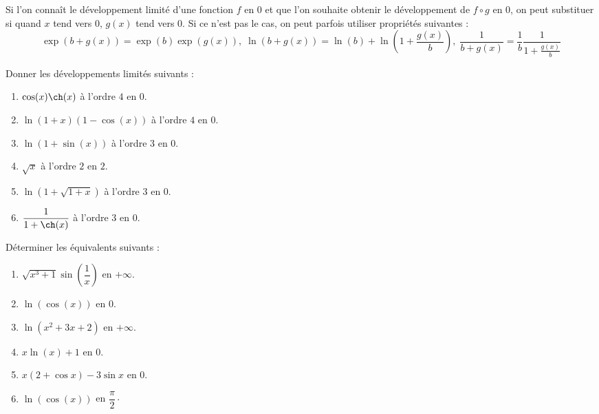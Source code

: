 \documentclass[a4paper,twoside,french,10pt]{VcCours}
\begin{document}
\medskip

Si l'on connaît le développement limité d'une fonction $f$ en $0$ et que l'on souhaite obtenir le développement de $f \circ g$ en $0$, on peut substituer si quand $x$ tend vers $0$, $g(x)$ tend vers $0$. Si ce n'est pas le cas, on peut parfois utiliser propriétés suivantes :
$$ \exp(b+g(x)) = \exp(b) \exp(g(x)), \; \ln(b+g(x))= \ln(b)+ \ln \left( 1 + \frac{g(x)}{b} \right), \; \frac{1}{b+g(x)} = \frac{1}{b}\frac{1}{1+ \frac{g(x)}{b}}$$

\medskip

\begin{Exercice}{}\end{Exercice} Donner les développements limités suivants : 

\begin{multicols}{2}
\begin{enumerate}
\item $\cos(x) \ch(x)$ à l'ordre $4$ en $0$.
\item $\ln(1+x)(1-\cos(x))$ à l'ordre $4$ en $0$.
\item $\ln(1+ \sin(x))$ à l'ordre $3$ en $0$.
\columnbreak
\item $\sqrt{x}$ à l'ordre $2$ en $2$.
\item $\ln(1 + \sqrt {1 + x})$ à l'ordre $3$ en $0$.
\item $\dfrac{1}{1+\ch(x)}$ à l'ordre $3$ en $0$.
\end{enumerate}
\end{multicols}

\medskip

\begin{Exercice}{}\end{Exercice} Déterminer les équivalents suivants :

\begin{multicols}{2}
\begin{enumerate}
\item $\sqrt{x^3+1} \sin \left( \dfrac{1}{x}\right)$ en $+ \infty$.
\item $\ln(\cos(x))$ en $0$.
\item $\ln(x^2+3x+2)$ en $+ \infty$.
\columnbreak
\item $x\ln(x)+1$ en $0$.
\item $x(2 + \cos x) - 3\sin x$ en $0$.
\item $\ln( \cos(x))$ en $\dfrac{\pi}{2}\cdot$
\end{enumerate}
\end{multicols}
\end{document}
